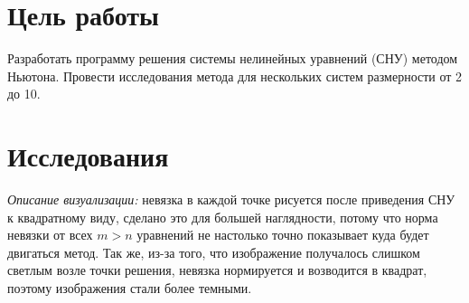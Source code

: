
\newcommand{\inputtable}[1]{
{\scriptsize
\pgfplotstabletypeset[
	columns/k/.style={column name=$k$,},
	columns/beta/.style={sci zerofill,precision=1,sci 10e, column name=$\beta$,},
	columns/residual/.style={sci zerofill,precision=1,sci 10e, column name={$\frac{||f(\mathbf{x}_k)||}{f(\mathbf{x}_0)}$},},
	columns/x/.style={zerofill, precision=8, column name={$x$}},
	columns/y/.style={zerofill, precision=8, column name={$y$}, column type/.add={}{|},},
	every head row/.style={before row=\hline,after row=\hline\hline}, 
	every last row/.style={after row=\hline},
	column type/.add={|}{},
	col sep=tab,
]{#1.dat}}
}

\newcommand{\insertcomparison}[2]{
\noindent\begin{tabu}{X[c]X[c]}
\multicolumn{2}{c}{\textbf{Вариант приведения к квадратному виду:} $#2$} \\
Аналитическое вычисление матрицы Якоби &
Численное вычисление матрицы Якоби \\
\noindent\texttt{[image: \#1\_analytic.png]} & 
\noindent\texttt{[image: \#1\_numeric.png]} \\
\inputtable{#1_analytic} & 
\inputtable{#1_numeric} \\
\end{tabu}
}


\section{Цель работы}

Разработать программу решения системы нелинейных уравнений (СНУ) методом Ньютона. Провести исследования метода для нескольких систем размерности от 2 до 10.

\section{Исследования}

\textit{Описание визуализации:} невязка в каждой точке рисуется после приведения СНУ к квадратному виду, сделано это для большей наглядности, потому что норма невязки от всех $m>n$ уравнений не настолько точно показывает куда будет двигаться метод. Так же, из-за того, что изображение получалось слишком светлым возле точки решения, невязка нормируется и возводится в квадрат, поэтому изображения стали более темными.

